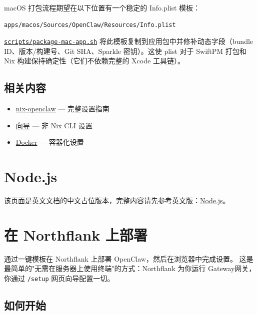 macOS 打包流程期望在以下位置有一个稳定的 Info.plist 模板：

\begin{lstlisting}
apps/macos/Sources/OpenClaw/Resources/Info.plist
\end{lstlisting}


\href{https://github.com/openclaw/openclaw/blob/main/scripts/package-mac-app.sh}{\texttt{scripts/package-mac-app.sh}} 将此模板复制到应用包中并修补动态字段（bundle ID、版本/构建号、Git SHA、Sparkle 密钥）。这使 plist 对于 SwiftPM 打包和 Nix 构建保持确定性（它们不依赖完整的 Xcode 工具链）。

\subsection{相关内容}


\begin{itemize}
  \item \href{https://github.com/openclaw/nix-openclaw}{nix-openclaw} — 完整设置指南
  \item \href{/start/wizard}{向导} — 非 Nix CLI 设置
  \item \href{/install/docker}{Docker} — 容器化设置
\end{itemize}



\clearpage

\section{Node.js}


该页面是英文文档的中文占位版本，完整内容请先参考英文版：\href{/install/node}{Node.js}。


\clearpage

\section{在 Northflank 上部署}

通过一键模板在 Northflank 上部署 OpenClaw，然后在浏览器中完成设置。
这是最简单的"无需在服务器上使用终端"的方式：Northflank 为你运行 Gateway网关，
你通过 \texttt{/setup} 网页向导配置一切。

\subsection{如何开始}


